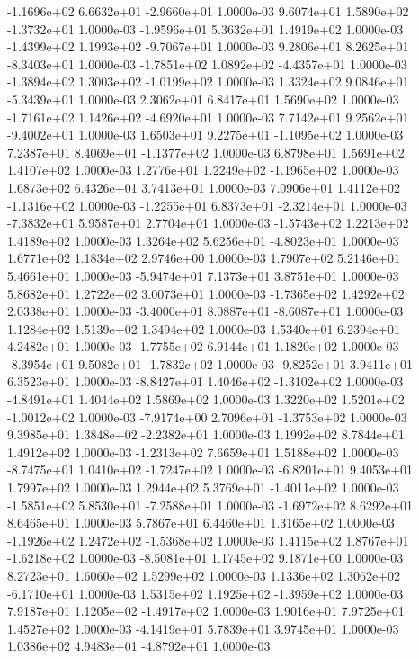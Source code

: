 -1.1696e+02  6.6632e+01 -2.9660e+01  1.0000e-03
 9.6074e+01  1.5890e+02 -1.3732e+01  1.0000e-03
-1.9596e+01  5.3632e+01  1.4919e+02  1.0000e-03
-1.4399e+02  1.1993e+02 -9.7067e+01  1.0000e-03
 9.2806e+01  8.2625e+01 -8.3403e+01  1.0000e-03
-1.7851e+02  1.0892e+02 -4.4357e+01  1.0000e-03
-1.3894e+02  1.3003e+02 -1.0199e+02  1.0000e-03
 1.3324e+02  9.0846e+01 -5.3439e+01  1.0000e-03
2.3062e+01 6.8417e+01 1.5690e+02  1.0000e-03
-1.7161e+02  1.1426e+02 -4.6920e+01  1.0000e-03
 7.7142e+01  9.2562e+01 -9.4002e+01  1.0000e-03
 1.6503e+01  9.2275e+01 -1.1095e+02  1.0000e-03
 7.2387e+01  8.4069e+01 -1.1377e+02  1.0000e-03
6.8798e+01 1.5691e+02 1.4107e+02  1.0000e-03
 1.2776e+01  1.2249e+02 -1.1965e+02  1.0000e-03
1.6873e+02 6.4326e+01 3.7413e+01  1.0000e-03
 7.0906e+01  1.4112e+02 -1.1316e+02  1.0000e-03
-1.2255e+01  6.8373e+01 -2.3214e+01  1.0000e-03
-7.3832e+01  5.9587e+01  2.7704e+01  1.0000e-03
-1.5743e+02  1.2213e+02  1.4189e+02  1.0000e-03
 1.3264e+02  5.6256e+01 -4.8023e+01  1.0000e-03
1.6771e+02 1.1834e+02 2.9746e+00  1.0000e-03
1.7907e+02 5.2146e+01 5.4661e+01  1.0000e-03
-5.9474e+01  7.1373e+01  3.8751e+01  1.0000e-03
5.8682e+01 1.2722e+02 3.0073e+01  1.0000e-03
-1.7365e+02  1.4292e+02  2.0338e+01  1.0000e-03
-3.4000e+01  8.0887e+01 -8.6087e+01  1.0000e-03
1.1284e+02 1.5139e+02 1.3494e+02  1.0000e-03
1.5340e+01 6.2394e+01 4.2482e+01  1.0000e-03
-1.7755e+02  6.9144e+01  1.1820e+02  1.0000e-03
-8.3954e+01  9.5082e+01 -1.7832e+02  1.0000e-03
-9.8252e+01  3.9411e+01  6.3523e+01  1.0000e-03
-8.8427e+01  1.4046e+02 -1.3102e+02  1.0000e-03
-4.8491e+01  1.4044e+02  1.5869e+02  1.0000e-03
 1.3220e+02  1.5201e+02 -1.0012e+02  1.0000e-03
-7.9174e+00  2.7096e+01 -1.3753e+02  1.0000e-03
 9.3985e+01  1.3848e+02 -2.2382e+01  1.0000e-03
1.1992e+02 8.7844e+01 1.4912e+02  1.0000e-03
-1.2313e+02  7.6659e+01  1.5188e+02  1.0000e-03
-8.7475e+01  1.0410e+02 -1.7247e+02  1.0000e-03
-6.8201e+01  9.4053e+01  1.7997e+02  1.0000e-03
 1.2944e+02  5.3769e+01 -1.4011e+02  1.0000e-03
-1.5851e+02  5.8530e+01 -7.2588e+01  1.0000e-03
-1.6972e+02  8.6292e+01  8.6465e+01  1.0000e-03
5.7867e+01 6.4460e+01 1.3165e+02  1.0000e-03
-1.1926e+02  1.2472e+02 -1.5368e+02  1.0000e-03
 1.4115e+02  1.8767e+01 -1.6218e+02  1.0000e-03
-8.5081e+01  1.1745e+02  9.1871e+00  1.0000e-03
8.2723e+01 1.6060e+02 1.5299e+02  1.0000e-03
 1.1336e+02  1.3062e+02 -6.1710e+01  1.0000e-03
 1.5315e+02  1.1925e+02 -1.3959e+02  1.0000e-03
 7.9187e+01  1.1205e+02 -1.4917e+02  1.0000e-03
1.9016e+01 7.9725e+01 1.4527e+02  1.0000e-03
-4.1419e+01  5.7839e+01  3.9745e+01  1.0000e-03
 1.0386e+02  4.9483e+01 -4.8792e+01  1.0000e-03
